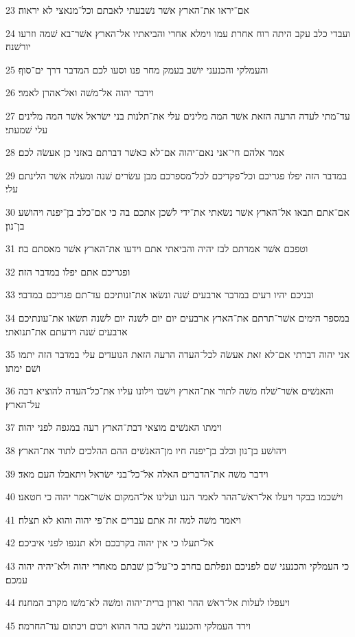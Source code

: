 \par 23 אם־יראו את־הארץ אשׁר נשׁבעתי לאבתם וכל־מנאצי לא יראוה׃
\par 24 ועבדי כלב עקב היתה רוח אחרת עמו וימלא אחרי והביאתיו אל־הארץ אשׁר־בא שׁמה וזרעו יורשׁנה׃
\par 25 והעמלקי והכנעני יושׁב בעמק מחר פנו וסעו לכם המדבר דרך ים־סוף׃
\par 26 וידבר יהוה אל־משׁה ואל־אהרן לאמר׃
\par 27 עד־מתי לעדה הרעה הזאת אשׁר המה מלינים עלי את־תלנות בני ישׂראל אשׁר המה מלינים עלי שׁמעתי׃
\par 28 אמר אלהם חי־אני נאם־יהוה אם־לא כאשׁר דברתם באזני כן אעשׂה לכם׃
\par 29 במדבר הזה יפלו פגריכם וכל־פקדיכם לכל־מספרכם מבן עשׂרים שׁנה ומעלה אשׁר הלינתם עלי׃
\par 30 אם־אתם תבאו אל־הארץ אשׁר נשׂאתי את־ידי לשׁכן אתכם בה כי אם־כלב בן־יפנה ויהושׁע בן־נון׃
\par 31 וטפכם אשׁר אמרתם לבז יהיה והביאתי אתם וידעו את־הארץ אשׁר מאסתם בה׃
\par 32 ופגריכם אתם יפלו במדבר הזה׃
\par 33 ובניכם יהיו רעים במדבר ארבעים שׁנה ונשׂאו את־זנותיכם עד־תם פגריכם במדבר׃
\par 34 במספר הימים אשׁר־תרתם את־הארץ ארבעים יום יום לשׁנה יום לשׁנה תשׂאו את־עונתיכם ארבעים שׁנה וידעתם את־תנואתי׃
\par 35 אני יהוה דברתי אם־לא זאת אעשׂה לכל־העדה הרעה הזאת הנועדים עלי במדבר הזה יתמו ושׁם ימתו׃
\par 36 והאנשׁים אשׁר־שׁלח משׁה לתור את־הארץ וישׁבו וילונו עליו את־כל־העדה להוציא דבה על־הארץ׃
\par 37 וימתו האנשׁים מוצאי דבת־הארץ רעה במגפה לפני יהוה׃
\par 38 ויהושׁע בן־נון וכלב בן־יפנה חיו מן־האנשׁים ההם ההלכים לתור את־הארץ׃
\par 39 וידבר משׁה את־הדברים האלה אל־כל־בני ישׂראל ויתאבלו העם מאד׃
\par 40 וישׁכמו בבקר ויעלו אל־ראשׁ־ההר לאמר הננו ועלינו אל־המקום אשׁר־אמר יהוה כי חטאנו׃
\par 41 ויאמר משׁה למה זה אתם עברים את־פי יהוה והוא לא תצלח׃
\par 42 אל־תעלו כי אין יהוה בקרבכם ולא תנגפו לפני איביכם׃
\par 43 כי העמלקי והכנעני שׁם לפניכם ונפלתם בחרב כי־על־כן שׁבתם מאחרי יהוה ולא־יהיה יהוה עמכם׃
\par 44 ויעפלו לעלות אל־ראשׁ ההר וארון ברית־יהוה ומשׁה לא־משׁו מקרב המחנה׃
\par 45 וירד העמלקי והכנעני הישׁב בהר ההוא ויכום ויכתום עד־החרמה׃

